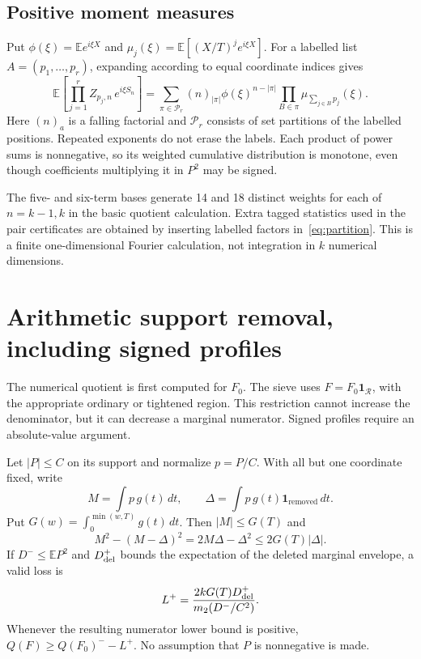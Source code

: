\documentclass[11pt,a4paper]{article}
\theoremstyle{definition}\newtheorem{definition}[theorem]{Definition}
\theoremstyle{remark}\newtheorem{remark}[theorem]{Remark}
\newcommand{\E}{\mathbb E}\newcommand{\Prob}{\mathbb P}
\newcommand{\ind}{\mathbf 1}\newcommand{\dd}{\,d}
\numberwithin{equation}{section}
\begin{document}
\subsection{Positive moment measures}
Put $\phi(\xi)=\E e^{i\xi X}$ and $\mu_j(\xi)=\E[(X/T)^j e^{i\xi X}]$. For a labelled list $A=(p_1,\ldots,p_r)$, expanding according to equal coordinate indices gives
\begin{equation}\label{eq:partition}
\E\left[\prod_{j=1}^r Z_{p_j,n}\,e^{i\xi S_n}\right]
=\sum_{\pi\in\mathcal P_r}(n)_{|\pi|}\phi(\xi)^{n-|\pi|}
\prod_{B\in\pi}\mu_{\sum_{j\in B}p_j}(\xi).
\end{equation}
Here $(n)_a$ is a falling factorial and $\mathcal P_r$ consists of set partitions of the labelled positions. Repeated exponents do not erase the labels. Each product of power sums is nonnegative, so its weighted cumulative distribution is monotone, even though coefficients multiplying it in $P^2$ may be signed.

The five- and six-term bases generate 14 and 18 distinct weights for each of $n=k-1,k$ in the basic quotient calculation. Extra tagged statistics used in the pair certificates are obtained by inserting labelled factors in~\eqref{eq:partition}. This is a finite one-dimensional Fourier calculation, not integration in $k$ numerical dimensions.

\section{Arithmetic support removal, including signed profiles}\label{sec:loss}
The numerical quotient is first computed for $F_0$. The sieve uses $F=F_0\ind_{\mathcal R}$, with the appropriate ordinary or tightened region. This restriction cannot increase the denominator, but it can decrease a marginal numerator. Signed profiles require an absolute-value argument.

Let $|P|\le C$ on its support and normalize $p=P/C$. With all but one coordinate fixed, write
\[
 M=\int p\,g(t)\dd t,\qquad
 \Delta=\int p\,g(t)\ind_{\mathrm{removed}}\dd t.
\]
Put $G(w)=\int_0^{\min(w,T)}g(t)\dd t$. Then $|M|\le G(T)$ and
\begin{equation}\label{eq:signedloss}
 M^2-(M-\Delta)^2=2M\Delta-\Delta^2\le2G(T)|\Delta|.
\end{equation}
If $D^-\le\E P^2$ and $D_{\rm del}^+$ bounds the expectation of the deleted marginal envelope, a valid loss is
\begin{equation}\label{eq:lossbound}
 L^+=\frac{2kG(T)D_{\rm del}^+}{m_2(D^-/C^2)}.
\end{equation}
Whenever the resulting numerator lower bound is positive,
$Q(F)\ge Q(F_0)^--L^+$. No assumption that $P$ is nonnegative is made.
\end{document}
